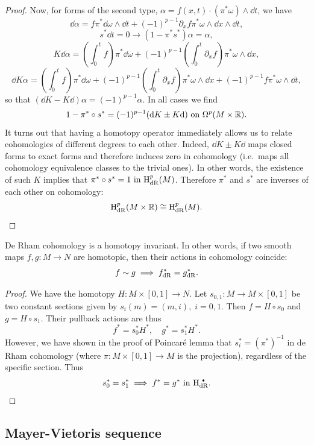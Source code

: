 \begin{proof}
    Now, for forms of the second type, $\alpha=f(x,t)\cdot(\pi^\ast\omega)\wedge\dd t$, we have
    \[\dd\alpha=f\pi^\ast\dd\omega\wedge\dd t+(-1)^{p-1}\partial_x f\pi^\ast\omega\wedge\dd x\wedge\dd t,\]
    \[s^\ast\dd t=0\rightarrow (1-\pi^\ast s^\ast)\alpha=\alpha,\]
    \[K\dd \alpha=\left(\int_0^t f\right)\pi^\ast\dd\omega+(-1)^{p-1}\left(\int_0^t\partial_x f\right)\pi^\ast\omega\wedge\dd x,\]
    \[\dd K\alpha=\left(\int_0^t f\right)\pi^\ast\dd\omega+(-1)^{p-1}\left(\int_0^t\partial_x f\right)\pi^\ast\omega\wedge\dd x+(-1)^{p-1}f\pi^\ast\omega\wedge\dd t,\]
    so that $(\dd K-K \dd)\alpha=(-1)^{p-1}\alpha$.
    In all cases we find
    \[1-\pi^\ast\circ s^\ast=(-1)^{p-1}({\mathrm{d}} K\pm K {\mathrm{d}}) \text{ on }\Omega^p(M\times\mathbb{R}).\]
    It turns out that having a homotopy operator immediately allows us to relate cohomologies of different degrees to each other. Indeed, $\dd K\pm K\dd$ maps closed forms to exact forms and therefore induces zero in cohomology (i.e.\ maps all cohomology equivalence classes to the trivial ones).
    In other words, the existence of such $K$ implies that 
    $\pi^\ast\circ s^\ast=1 \text{ in }\mathrm{H}^p_{\rm dR}(M)$.
    Therefore $\pi^\ast$ and $s^\ast$ are inverses of each other on cohomology:
    \[\mathrm{H}^p_{\rm dR}(M\times\mathbb{R})\cong \mathrm{H}^p_{\rm dR}(M).\]
\end{proof}

\begin{cor}
    De Rham cohomology is a homotopy invariant. In other words, if two smooth maps $f,g:M\to N$ are homotopic, then their actions in cohomology coincide:
    \[f\sim g\implies f^\ast_{\rm dR}=g^\ast_{\rm dR}.\]
\end{cor}
\begin{proof}
    We have the homotopy $H:M\times[0,1]\to N$. Let $s_{0,1}:M\to M\times [0,1]$ be two constant sections given by $s_i(m)=(m,i),\;i=0,1$. Then $f=H\circ s_0$ and $g=H\circ s_1$. Their pullback actions are thus
    \[f^\ast=s_0^\ast H^\ast,\quad g^\ast=s_1^\ast H^\ast.\]
    However, we have shown in the proof of Poincar\'e lemma that $s_i^\ast=(\pi^\ast)^{-1}$ in de Rham cohomology (where $\pi:M\times [0,1]\to M$ is the projection), regardless of the specific section. Thus
    \[s_0^\ast=s_1^\ast\implies f^\ast=g^\ast \text{ in }\rmH^{\smbullet }_{\rm dR}.\]
\end{proof}


\subsection{Mayer-Vietoris sequence}

